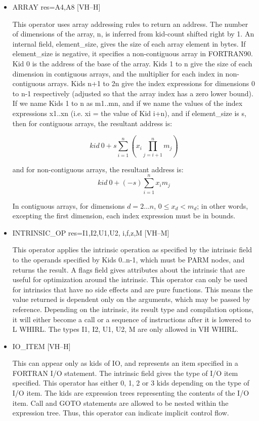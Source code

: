 \documentclass{article}
\begin{document}
\begin{itemize}
\item  ARRAY res=A4,A8 \hfill [VH--H]

This operator uses array addressing rules to return an address.
The number of dimensions of the array, n, is inferred from kid-count
shifted right
by 1. An internal field, element\_size, gives the size of
each array element in bytes. If element\_size is negative, it specifies
a non-contiguous array in FORTRAN90. Kid 0 is the address of the
base of the array. Kids 1 to n give the size of each dimension in
contiguous arrays, and the multiplier for each index in non-contiguous
arrays. Kids n+1 to 2n give the index expressions for dimensions 0
to n-1 respectively (adjusted so that the array index has a zero
lower bound). If we name Kids 1 to n as m1..mn, and if we name the
values of the index expressions x1..xn (i.e. xi = the value of Kid
i+n), and if element\_size is s, then for contiguous arrays, the
resultant address is:

\begin{displaymath}
kid~0 + s \sum^n_{i=1} \left( x_i \prod^n_{j=i+1} m_j\right)
\end{displaymath}

and for non-contiguous arrays, the resultant address is: 
\begin{displaymath}
kid~0 + (-s) \sum^n_{i=1} x_i  m_j
\end{displaymath}

In contiguous arrays, for dimensions $d=2\ldots n$, $0 \leq x_d < m_d$; 
in other words, excepting
the first dimension, each index expression must be in bounds. 

\item
INTRINSIC\_OP res=I1,I2,U1,U2, i,f,z,M  \hfill [VH--M]

This operator applies the intrinsic operation as specified by the
intrinsic field to the operands specified by Kids 0..n-1, which must
be PARM nodes, and returns the result. A flags field gives attributes
about the intrinsic that are useful for optimization around the
intrinsic. This operator can only be used for intrinsics that have
no side effects and are pure functions. This means the value returned
is dependent only on the arguments, which may be passed by reference.
Depending on the intrinsic, its result type and compilation options,
it will either become a call or a sequence of instructions after it
is lowered to L WHIRL. The types I1, I2, U1, U2, M are only allowed
in VH WHIRL. \item  IO\_ITEM \hfill [VH--H]

This can appear only as kids of IO, and represents an item specified
in a FORTRAN I/O statement. The intrinsic field gives the type of
I/O item specified. This operator has either 0, 1, 2 or 3 kids depending on
the type of I/O item. The kids are expression trees representing
the contents of the I/O item. Call and GOTO statements are allowed
to be nested within the expression tree. Thus, this operator can
indicate implicit control flow.

\end{itemize}
\end{document}
